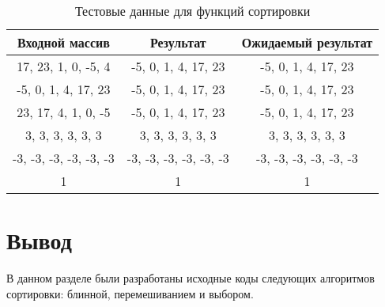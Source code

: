 \begin{table}[h]
	\begin{center}
		\caption{\label{tests}Тестовые данные для функций сортировки}
		\begin{tabular}{|c|c|c|}
			\hline
			\textbf{Входной массив} & \textbf{Результат} & \textbf{Ожидаемый результат} \\
			\hline
			17, 23, 1, 0, -5, 4 & -5, 0, 1, 4, 17, 23  & -5, 0, 1, 4, 17, 23 \\
			\hline
			-5, 0, 1, 4, 17, 23 & -5, 0, 1, 4, 17, 23  & -5, 0, 1, 4, 17, 23 \\
			\hline
			23, 17, 4, 1, 0, -5 & -5, 0, 1, 4, 17, 23  & -5, 0, 1, 4, 17, 23 \\
			\hline
			3, 3, 3, 3, 3, 3 & 3, 3, 3, 3, 3, 3 & 3, 3, 3, 3, 3, 3 \\
			\hline
			-3, -3, -3, -3, -3, -3 & -3, -3, -3, -3, -3, -3 & -3, -3, -3, -3, -3, -3 \\
			\hline
			1 & 1 & 1 \\
			\hline
		\end{tabular}
	\end{center}
\end{table}

\section*{Вывод}

В данном разделе были разработаны исходные коды следующих алгоритмов сортировки: блинной, перемешиванием и выбором.

\clearpage
